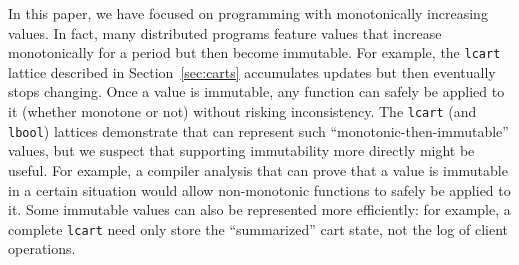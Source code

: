 In this paper, we have focused on programming with monotonically increasing
values. In fact, many distributed programs feature values that increase
monotonically for a period but then become immutable. For example, the
\texttt{lcart} lattice described in Section~\ref{sec:carts} accumulates updates
but then eventually stops changing. Once a value is immutable, any function can
safely be applied to it (whether monotone or not) without risking
inconsistency. The \texttt{lcart} (and \texttt{lbool}) lattices demonstrate that
\lang can represent such ``monotonic-then-immutable'' values, but we suspect
that supporting immutability more directly might be useful. For example, a
compiler analysis that can prove that a value is immutable in a certain
situation would allow non-monotonic functions to safely be applied to it. Some
immutable values can also be represented more efficiently: for example, a
complete \texttt{lcart} need only store the ``summarized'' cart state, not the
log of client operations.




